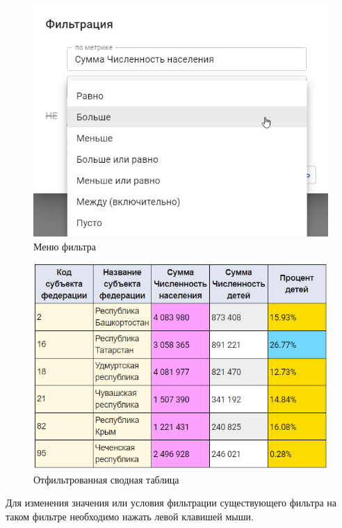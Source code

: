 \documentclass[../user-manual.tex]{subfiles}
\begin{document}
	\begin{figure}[h]
		\centering
		\includegraphics[width=\graphicswidth]{img/20-filtration_menu.png}
		\caption{Меню фильтра}
		\label{fig:filtration-menu-1}
	\end{figure}

	\begin{figure}[h]
		\centering
		\includegraphics[width=\graphicswidth]{img/21-filtered-pivot.png}
		\caption{Отфильтрованная сводная таблица}
		\label{fig:filtered-pivot}
	\end{figure}

	Для изменения значения или условия фильтрации существующего фильтра на таком фильтре необходимо нажать левой клавишей мыши.
	
\end{document}
